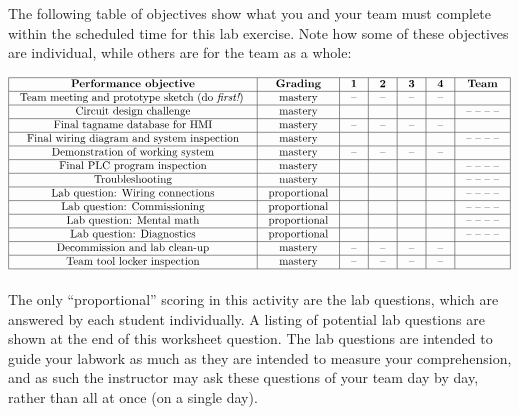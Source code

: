 \documentclass[12pt,a4paper]{article}
\begin{document}
\begin{itemize}
The following table of objectives show what you and your team must complete within the scheduled time for this lab exercise.  Note how some of these objectives are individual, while others are for the team as a whole:

\vskip 10pt



$$\vbox{\offinterlineskip
\halign{\strut
\vrule \quad\hfil # \ \hfil & 
\vrule \quad\hfil # \ \hfil & 
\vrule \quad\hfil # \ \hfil & 
\vrule \quad\hfil # \ \hfil & 
\vrule \quad\hfil # \ \hfil & 
\vrule \quad\hfil # \ \hfil & 
\vrule \quad\hfil # \ \hfil \vrule \cr
\noalign{\hrule}
%
{\bf Performance objective} & {\bf Grading} & {\bf 1} & {\bf 2} & {\bf 3} & {\bf 4} & {\bf Team} \cr
%
\noalign{\hrule}
%
Team meeting and prototype sketch (do {\it first!}) & mastery & -- & -- & -- & -- & \cr
%
\noalign{\hrule}
%
Circuit design challenge & mastery & & & & & -- -- -- -- \cr
%
\noalign{\hrule}
%
Final tagname database for HMI & mastery & -- & -- & -- & -- & \cr
%
\noalign{\hrule}
%
Final wiring diagram and system inspection & mastery & & & & & -- -- -- -- \cr
%
\noalign{\hrule}
%
Demonstration of working system & mastery & -- & -- & -- & -- & \cr
%
\noalign{\hrule}
%
Final PLC program inspection & mastery &  &  &  &  & -- -- -- --  \cr
%
\noalign{\hrule}
%
Troubleshooting & mastery & & & & & -- -- -- -- \cr
%
\noalign{\hrule}
%
Lab question: Wiring connections & proportional &  &  &  &  & -- -- -- -- \cr
%
\noalign{\hrule}
%
Lab question: Commissioning & proportional &  &  &  &  & -- -- -- -- \cr
%
\noalign{\hrule}
%
Lab question: Mental math & proportional &  &  &  &  & -- -- -- -- \cr
%
\noalign{\hrule}
%
Lab question: Diagnostics & proportional &  &  &  &  & -- -- -- -- \cr
%
\noalign{\hrule}
%
Decommission and lab clean-up & mastery & -- & -- & -- & -- &  \cr
%
\noalign{\hrule}
%
Team tool locker inspection & mastery & -- & -- & -- & -- &  \cr
%
\noalign{\hrule}
} %
}$$ %

The only ``proportional'' scoring in this activity are the lab questions, which are answered by each student individually.  A listing of potential lab questions are shown at the end of this worksheet question.  The lab questions are intended to guide your labwork as much as they are intended to measure your comprehension, and as such the instructor may ask these questions of your team day by day, rather than all at once (on a single day).


\end{itemize}
\end{document}
